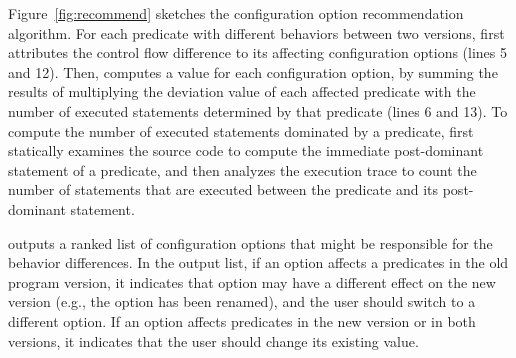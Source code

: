 Figure~\ref{fig:recommend} sketches the configuration option
recommendation algorithm.
For each predicate with different behaviors between two
versions, \ourtool first attributes the control flow difference 
to its affecting configuration options (lines 5 and 12). Then,
\ourtool computes a value for each configuration option, by summing
the results of multiplying the deviation value of each affected
predicate with the number of
executed statements determined by that predicate (lines 6 and 13).
To compute the number of executed statements dominated by a predicate,
\ourtool first statically examines the source code to compute
the immediate post-dominant statement of a predicate, and then
analyzes the execution trace to count the number of statements that
are executed between the predicate and its post-dominant
statement. 


\ourtool outputs a ranked list of
configuration options that might be responsible for the
behavior differences. In the output list, if an option affects 
a predicates in the old program version,
it indicates that option may have a different effect on the new
version (e.g., the option has
been renamed), and the user should switch to a different option.
If an option affects predicates in the new version or in both
versions, it indicates that the user should change its
existing value.





